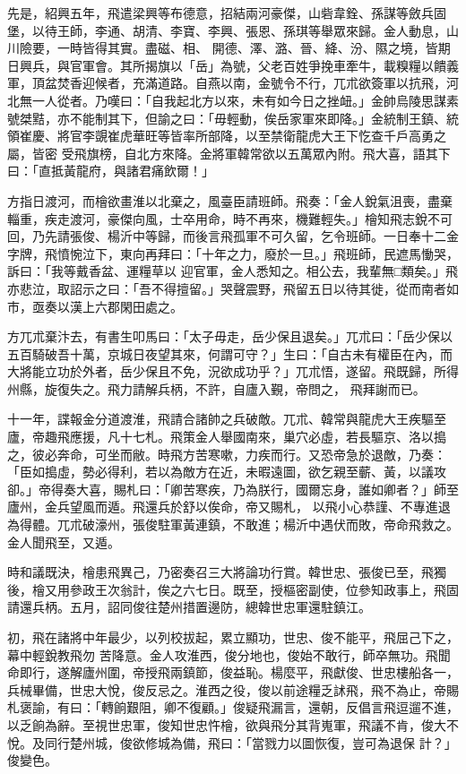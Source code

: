 \begin{pinyinscope}
 先是，紹興五年，飛遣梁興等布德意，招結兩河豪傑，山砦韋銓、孫謀等斂兵固堡，以待王師，李通、胡清、李寶、李興、張恩、孫琪等舉眾來歸。金人動息，山川險要，一時皆得其實。盡磁、相、
 開德、澤、潞、晉、絳、汾、隰之境，皆期日興兵，與官軍會。其所揭旗以「岳」為號，父老百姓爭挽車牽牛，載糗糧以饋義軍，頂盆焚香迎候者，充滿道路。自燕以南，金號令不行，兀朮欲簽軍以抗飛，河北無一人從者。乃嘆曰：「自我起北方以來，未有如今日之挫衄。」金帥烏陵思謀素號桀黠，亦不能制其下，但諭之曰：「毋輕動，俟岳家軍來即降。」金統制王鎮、統領崔慶、將官李覬崔虎華旺等皆率所部降，以至禁衛龍虎大王下忔查千戶高勇之屬，皆密
 受飛旗榜，自北方來降。金將軍韓常欲以五萬眾內附。飛大喜，語其下曰：「直抵黃龍府，與諸君痛飲爾！」



 方指日渡河，而檜欲畫淮以北棄之，風臺臣請班師。飛奏：「金人銳氣沮喪，盡棄輜重，疾走渡河，豪傑向風，士卒用命，時不再來，機難輕失。」檜知飛志銳不可回，乃先請張俊、楊沂中等歸，而後言飛孤軍不可久留，乞令班師。一日奉十二金字牌，飛憤惋泣下，東向再拜曰：「十年之力，廢於一旦。」飛班師，民遮馬慟哭，訴曰：「我等戴香盆、運糧草以
 迎官軍，金人悉知之。相公去，我輩無□類矣。」飛亦悲泣，取詔示之曰：「吾不得擅留。」哭聲震野，飛留五日以待其徙，從而南者如市，亟奏以漢上六郡閑田處之。



 方兀朮棄汴去，有書生叩馬曰：「太子毋走，岳少保且退矣。」兀朮曰：「岳少保以五百騎破吾十萬，京城日夜望其來，何謂可守？」生曰：「自古未有權臣在內，而大將能立功於外者，岳少保且不免，況欲成功乎？」兀朮悟，遂留。飛既歸，所得州縣，旋復失之。飛力請解兵柄，不許，自廬入覲，帝問之，
 飛拜謝而已。



 十一年，諜報金分道渡淮，飛請合諸帥之兵破敵。兀朮、韓常與龍虎大王疾驅至廬，帝趣飛應援，凡十七札。飛策金人舉國南來，巢穴必虛，若長驅京、洛以搗之，彼必奔命，可坐而敝。時飛方苦寒嗽，力疾而行。又恐帝急於退敵，乃奏：「臣如搗虛，勢必得利，若以為敵方在近，未暇遠圖，欲乞親至蘄、黃，以議攻卻。」帝得奏大喜，賜札曰：「卿苦寒疾，乃為朕行，國爾忘身，誰如卿者？」師至廬州，金兵望風而遁。飛還兵於舒以俟命，帝又賜札，
 以飛小心恭謹、不專進退為得體。兀朮破濠州，張俊駐軍黃連鎮，不敢進；楊沂中遇伏而敗，帝命飛救之。金人聞飛至，又遁。



 時和議既決，檜患飛異己，乃密奏召三大將論功行賞。韓世忠、張俊已至，飛獨後，檜又用參政王次翁計，俟之六七日。既至，授樞密副使，位參知政事上，飛固請還兵柄。五月，詔同俊往楚州措置邊防，總韓世忠軍還駐鎮江。



 初，飛在諸將中年最少，以列校拔起，累立顯功，世忠、俊不能平，飛屈己下之，幕中輕銳教飛勿
 苦降意。金人攻淮西，俊分地也，俊始不敢行，師卒無功。飛聞命即行，遂解廬州圍，帝授飛兩鎮節，俊益恥。楊麼平，飛獻俊、世忠樓船各一，兵械畢備，世忠大悅，俊反忌之。淮西之役，俊以前途糧乏訹飛，飛不為止，帝賜札褒諭，有曰：「轉餉艱阻，卿不復顧。」俊疑飛漏言，還朝，反倡言飛逗遛不進，以乏餉為辭。至視世忠軍，俊知世忠忤檜，欲與飛分其背嵬軍，飛議不肯，俊大不悅。及同行楚州城，俊欲修城為備，飛曰：「當戮力以圖恢復，豈可為退保
 計？」俊變色。




\end{pinyinscope}
